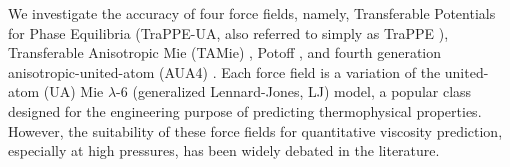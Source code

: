 \documentclass[preprint,review,12pt]{elsarticle}
\begin{document}
	 We investigate the accuracy of four force fields, namely, Transferable Potentials for Phase Equilibria (TraPPE-UA, also referred to simply as TraPPE \cite{TraPPE,Martin1999,TraPPEUA2}), Transferable Anisotropic Mie (TAMie) \cite{TAMie,Weidler2016}, Potoff \cite{Mie,Potoff_branched}, and fourth generation anisotropic-united-atom (AUA4) \cite{AUA4,Nieto2008}. Each force field is a variation of the united-atom (UA) Mie $\lambda$-6 (generalized Lennard-Jones, LJ) model, a popular class designed for the engineering purpose of predicting thermophysical properties. However, the suitability of these force fields for quantitative viscosity prediction, especially at high pressures, has been widely debated in the literature.
	 
	
	
	
	
	
\end{document}
